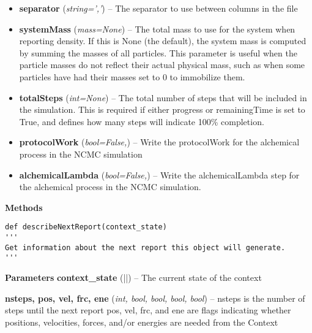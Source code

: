 \begin{description}
\begin{description}
\begin{itemize}
  \textbf{elapsedTime} (\emph{bool=False}) -- Whether to write the
  elapsed time of the simulation in seconds to the file.
\item
  \textbf{separator} (\emph{string=','}) -- The separator to use between
  columns in the file
\item
  \textbf{systemMass} (\emph{mass=None}) -- The total mass to use for
  the system when reporting density. If this is None (the default), the
  system mass is computed by summing the masses of all particles. This
  parameter is useful when the particle masses do not reflect their
  actual physical mass, such as when some particles have had their
  masses set to 0 to immobilize them.
\item
  \textbf{totalSteps} (\emph{int=None}) -- The total number of steps
  that will be included in the simulation. This is required if either
  progress or remainingTime is set to True, and defines how many steps
  will indicate 100\% completion.
\item
  \textbf{protocolWork} (\emph{bool=False,}) -- Write the protocolWork
  for the alchemical process in the NCMC simulation
\item
  \textbf{alchemicalLambda} (\emph{bool=False,}) -- Write the
  alchemicalLambda step for the alchemical process in the NCMC
  simulation.
\end{itemize}
\end{description}

\begin{description}
\item
    \textbf{Methods}

\begin{verbatim}
def describeNextReport(context_state)
'''
Get information about the next report this object will generate.
'''
\end{verbatim}

\begin{description}
\item
    \textbf{Parameters}
\textbf{context\_state} (\VERB||) -- The current
state of the context
\item[Returns]
\textbf{nsteps, pos, vel, frc, ene} (\emph{int, bool, bool, bool, bool})
-- nsteps is the number of steps until the next report pos, vel, frc,
and ene are flags indicating whether positions, velocities, forces,
and/or energies are needed from the Context
\end{description}
\end{description}


\end{description}
